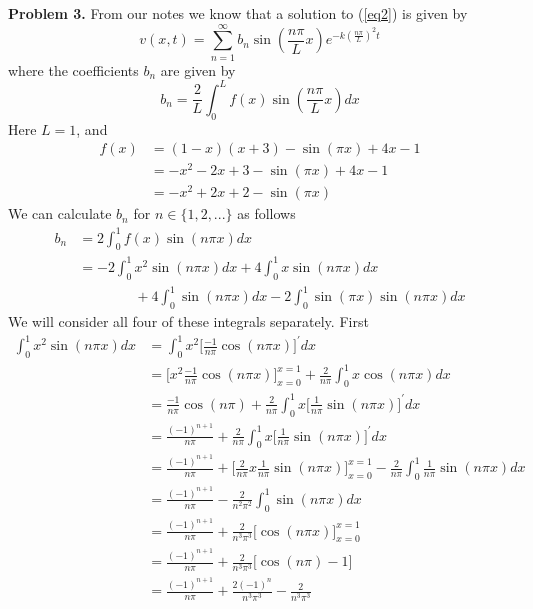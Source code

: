 \documentclass[12pt]{article}
\newcommand{\problem}[1]{\hspace{-4 ex} \large \textbf{Problem #1} }
\begin{document}
\problem{3. } From our notes we know that a solution to (\ref{eq2}) is given by
$$
v(x,t) = \sum\limits_{n=1}^\infty b_n \sin(\frac{n \pi}{L}x)e^{-k (\frac{n \pi}{L})^2t}
$$
where the coefficients $b_n$ are given by
$$
b_n = \frac{2}{L}\int_{0}^{L}f(x) \sin(\frac{n \pi}{L}x) dx
$$
Here $L = 1$, and 
\begin{align*}
f(x) & = (1 - x)(x + 3) - \sin(\pi x) + 4x - 1 \\
& = -x^2 - 2x + 3 - \sin(\pi x) + 4x - 1 \\
& = -x^2 + 2x + 2 - \sin(\pi x)
\end{align*}
We can calculate $b_n$ for $n \in \{1, 2, ...\}$ as follows
\begin{align*}
	b_n & = 2\int_{0}^{1}f(x) \sin(n \pi x) dx \\
	& = -2\int_{0}^{1}x^2 \sin(n \pi x) dx + 4 \int_{0}^{1}x \sin(n \pi x) dx \\
	& \phantom{===} + 4 \int_{0}^{1} \sin(n \pi x) dx - 2\int_{0}^{1} \sin(\pi x)\sin(n \pi x) dx
\end{align*}
We will consider all four of these integrals separately. First
\begin{align*}
	\int_{0}^{1}x^2 \sin(n \pi x) dx & = \int_{0}^{1}x^2 \bigg[ \frac{-1}{n \pi}\cos(n \pi x) \bigg]^{\prime} dx \\
	& = \bigg[ x^2 \frac{-1}{n \pi}\cos(n \pi x) \bigg]_{x=0}^{x=1}  + \frac{2}{n \pi} \int_{0}^{1} x \cos(n \pi x) dx \\
	& = \frac{-1}{n \pi}\cos(n \pi) + \frac{2}{n \pi} \int_{0}^{1} x \bigg[\frac{1}{n \pi}\sin(n \pi x) \bigg]^{\prime} dx \\
	& = \frac{(-1)^{n+1}}{n \pi} + \frac{2}{n \pi} \int_{0}^{1} x \bigg[\frac{1}{n \pi}\sin(n \pi x) \bigg]^{\prime} dx \\
	& = \frac{(-1)^{n+1}}{n \pi} + \bigg[ \frac{2}{n \pi} x\frac{1}{n \pi}\sin(n \pi x) \bigg]_{x=0}^{x=1} - \frac{2}{n \pi}\int_{0}^{1} \frac{1}{n \pi}\sin(n \pi x) dx \\
	& = \frac{(-1)^{n+1}}{n \pi} - \frac{2}{n^2 \pi^2}\int_{0}^{1} \sin(n \pi x) dx \\
	& = \frac{(-1)^{n+1}}{n \pi} + \frac{2}{n^3 \pi^3} \bigg[ \cos(n \pi x) \bigg]_{x=0}^{x=1} \\
	& = \frac{(-1)^{n+1}}{n \pi} + \frac{2}{n^3 \pi^3} \bigg[ \cos(n \pi)  - 1\bigg] \\
	& = \frac{(-1)^{n+1}}{n \pi} + \frac{2(-1)^{n}}{n^3 \pi^3} - \frac{2}{n^3 \pi^3} \\
\end{align*}
\end{document}
